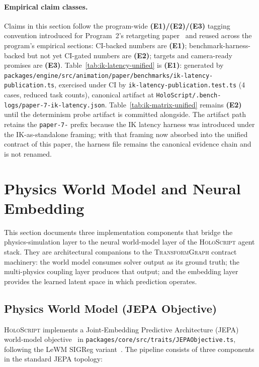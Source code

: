 \documentclass[sigconf,nonacm]{acmart}
\newcommand{\holoscript}{\textsc{HoloScript}}
\newcommand{\transformgraph}{\textsc{TransformGraph}}
\begin{document}
\paragraph{Empirical claim classes.}
Claims in this section follow the program-wide \textbf{(E1)/(E2)/(E3)}
tagging convention introduced for Program~2's retargeting
paper~\cite{paper-6-anim-sca2027} and reused across the program's
empirical sections: CI-backed numbers are \textbf{(E1)};
benchmark-harness-backed but not yet CI-gated numbers are \textbf{(E2)};
targets and camera-ready promises are \textbf{(E3)}.
Table~\ref{tab:ik-latency-unified} is \textbf{(E1)}: generated by
\texttt{packages/engine/src/animation/paper/benchmarks/ik-latency-publication.ts},
exercised under CI by \texttt{ik-latency-publication.test.ts} (4 cases,
reduced task counts), canonical artifact at
\texttt{HoloScript/.bench-logs/paper-7-ik-latency.json}.
Table~\ref{tab:ik-matrix-unified} remains \textbf{(E2)} until the
determinism probe artifact is committed alongside. The artifact path
retains the \texttt{paper-7-} prefix because the IK latency harness was
introduced under the IK-as-standalone framing; with that framing now
absorbed into the unified contract of this paper, the harness file
remains the canonical evidence chain and is not renamed.

\section{Physics World Model and Neural Embedding}
\label{sec:worldmodel}

This section documents three implementation components that bridge the
physics-simulation layer to the neural world-model layer of the
\holoscript{} agent stack.  They are architectural companions to the
\transformgraph{} contract machinery: the world model consumes solver
output as its ground truth; the multi-physics coupling layer produces
that output; and the embedding layer provides the learned latent space
in which prediction operates.

\subsection{Physics World Model (JEPA Objective)}
\label{sec:worldmodel:jepa}

\holoscript{} implements a Joint-Embedding Predictive Architecture
(JEPA) world-model objective~\cite{assran-ijepa2023,lecun-lewm2025} in
\texttt{packages/core/src/traits/JEPAObjective.ts}, following the
LeWM SIGReg variant~\cite{maes-lewm2024}.
The pipeline consists of three components in the standard JEPA topology:
\end{document}
